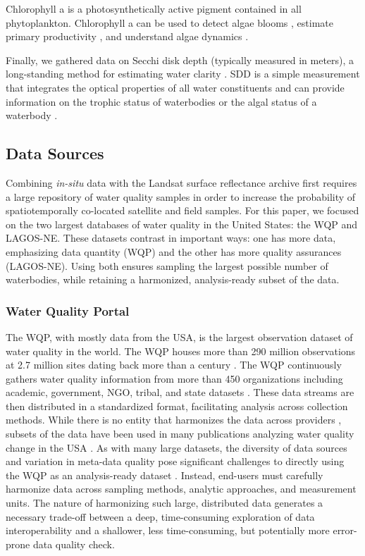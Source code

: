 \documentclass[]{agujournal2018}
\begin{document}
Chlorophyll a is a photosynthetically active pigment contained in all
phytoplankton. Chlorophyll a can be used to detect algae blooms
\citep{Kutser2004}, estimate primary productivity \citep{Antoine1996},
and understand algae dynamics \citep{Richardson1996}.

Finally, we gathered data on Secchi disk depth (typically measured in
meters), a long-standing method for estimating water clarity
\citep{Secchi1864,Lee2018}. SDD is a simple measurement that integrates
the optical properties of all water constituents and can provide
information on the trophic status of waterbodies \citep{Carlson1977} or
the algal status of a waterbody \citep{Lorenzen1980}.

\subsection{Data Sources}

Combining \emph{in-situ} data with the Landsat surface reflectance
archive first requires a large repository of water quality samples in
order to increase the probability of spatiotemporally co-located
satellite and field samples. For this paper, we focused on the two
largest databases of water quality in the United States: the WQP and
LAGOS-NE. These datasets contrast in important ways: one has more data,
emphasizing data quantity (WQP) and the other has more quality
assurances (LAGOS-NE). Using both ensures sampling the largest possible
number of waterbodies, while retaining a harmonized, analysis-ready
subset of the data.

\subsubsection{Water Quality Portal}

The WQP, with mostly data from the USA, is the largest observation
dataset of water quality in the world. The WQP houses more than 290
million observations at 2.7 million sites dating back more than a
century \citep{Read2017}. The WQP continuously gathers water quality
information from more than 450 organizations including academic,
government, NGO, tribal, and state datasets \citep{Read2017}. These data
streams are then distributed in a standardized format, facilitating
analysis across collection methods. While there is no entity that
harmonizes the data across providers \citep{Read2017}, subsets of the
data have been used in many publications analyzing water quality change
in the USA \citep{Booth2011,Sprague2009,Oelsner2017}. As with many large
datasets, the diversity of data sources and variation in meta-data
quality pose significant challenges to directly using the WQP as an
analysis-ready dataset \citep{Sprague2017}. Instead, end-users must
carefully harmonize data across sampling methods, analytic approaches,
and measurement units. The nature of harmonizing such large, distributed
data generates a necessary trade-off between a deep, time-consuming
exploration of data interoperability and a shallower, less
time-consuming, but potentially more error-prone data quality check.
\end{document}
